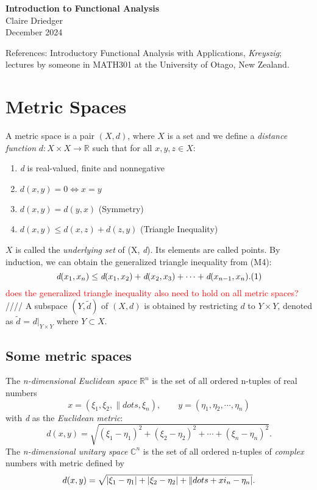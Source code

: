 \documentclass[11pt]{article}
\newcommand{\defn}[0]{\tcbhighmath[boxrule=0.5mm, colframe=cyan!20, colback=cyan!20, arc=10mm, size=fbox]{DEF:}}
\newcommand{\ex}[0]{\tcbhighmath[boxrule=0.5mm, colframe=pink, colback=pink, arc=10mm, size=fbox]{Ex:}}
\begin{document}
\begin{center}
    {\LARGE \textbf{Introduction to Functional Analysis}} \\[0.5em]
    {\large Claire Driedger} \\[0.3em]
    {\normalsize December 2024}
\end{center}
\noindent
\colorbox{gray!20}{%
  \parbox{\textwidth}{%
    References: Introductory Functional Analysis with Applications, \textit{Kreyszig}; 
    lectures by someone in MATH301 at the University of Otago, New Zealand.
  }
}

\tableofcontents
\newpage

\section{Metric Spaces}
\defn{}
A metric space is a pair $(X,d)$, where $X$ is a set and we define a \textit{distance function} $ d: X \times X \to \mathbb{R} $ such that for all $x, y, z \in X$:
\begin{enumerate}[label= (M\arabic*), left=1cm]
    \item \textit{d} is real-valued, finite and nonnegative
    \item $\mathit{d}(x, y) = 0 \iff x = y$
    \item $\mathit{d}(x, y) = \mathit{d}(y, x)$ \hfill (Symmetry)
    \item $\textit{d}(x, y) \leq \textit{d}(x, z) + \textit{d}(z, y)$ \hfill (Triangle Inequality)
\end{enumerate}
$X$ is called the \textit{underlying set} of (X, \textit{d}). Its elements are called points. 
By induction, we can obtain the generalized triangle inequality from (M4):
\[ \textit{d} (x_1, x_n) \leq \textit{d}(x_1, x_2) + \textit{d}(x_2, x_3) + \cdots + \textit{d}(x_{n-1}, x_n). \hfill (1)
\]
\textcolor{red}{does the generalized triangle inequality also need to hold on all metric spaces?}
////
\defn{}
A subspace $(Y, \tilde{d})$ of $(X, d)$ is obtained by restricting $d$ to $Y \times Y$, denoted as $\tilde{d}$ = $d|_{Y\times Y}$ where $Y\subset X$.
\subsection{Some metric spaces}
\vspace{1em}
\noindent
\ex{}
The \textit{n-dimensional Euclidean space} $\mathbb{R}^n$ is the set of all ordered n-tuples of real numbers
\[ x = (\xi_1,\xi_2,\|dots,\xi_n), \quad\quad y = (\eta_1, \eta_2, \cdots, \eta_n) \]
with \textit{d} as the \textit{Euclidean metric}:
\[ d(x,y) = \sqrt{(\xi_1 - \eta_1)^2 +(\xi_2 - \eta_2)^2 + \cdots + (\xi_n - \eta_n)^2}. \]
The \textit{n-dimensional unitary space} $\mathbb{C}^n$ is the set of all ordered n-tuples of \textit{complex} numbers with metric defined by
\[ d(x,y) = \sqrt{|\xi_1 - \eta_1| +|\xi_2 - \eta_2| + \|dots + \\xi_n - \eta_n|}. \]
\end{document}

